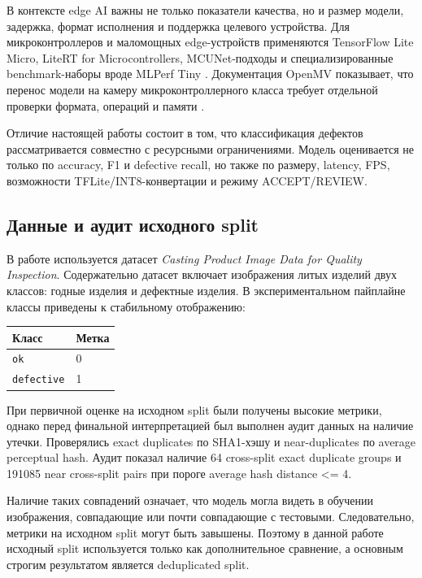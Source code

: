 \documentclass[12pt,a4paper]{article}
\begin{document}
В контексте edge AI важны не только показатели качества, но и размер модели, задержка, формат исполнения и поддержка целевого устройства. Для микроконтроллеров и маломощных edge-устройств применяются TensorFlow Lite Micro, LiteRT for Microcontrollers, MCUNet-подходы и специализированные benchmark-наборы вроде MLPerf Tiny \cite{tensorflow_lite_micro,litert_micro,lin2020mcunet,banbury2021mlperf_tiny}. Документация OpenMV показывает, что перенос модели на камеру микроконтроллерного класса требует отдельной проверки формата, операций и памяти \cite{openmv_docs,openmv_h7plus}.

Отличие настоящей работы состоит в том, что классификация дефектов рассматривается совместно с ресурсными ограничениями. Модель оценивается не только по accuracy, F1 и defective recall, но также по размеру, latency, FPS, возможности TFLite/INT8-конвертации и режиму ACCEPT/REVIEW.

\subsection{Данные и аудит исходного split}

В работе используется датасет \textit{Casting Product Image Data for Quality Inspection}. Содержательно датасет включает изображения литых изделий двух классов: годные изделия и дефектные изделия. В экспериментальном пайплайне классы приведены к стабильному отображению:

\begin{center}
\begin{tabular}{ll}
\toprule
Класс & Метка \\
\midrule
\texttt{ok} & 0 \\
\texttt{defective} & 1 \\
\bottomrule
\end{tabular}
\end{center}

При первичной оценке на исходном split были получены высокие метрики, однако перед финальной интерпретацией был выполнен аудит данных на наличие утечки. Проверялись exact duplicates по SHA1-хэшу и near-duplicates по average perceptual hash. Аудит показал наличие 64 cross-split exact duplicate groups и 191085 near cross-split pairs при пороге average hash distance <= 4.

Наличие таких совпадений означает, что модель могла видеть в обучении изображения, совпадающие или почти совпадающие с тестовыми. Следовательно, метрики на исходном split могут быть завышены. Поэтому в данной работе исходный split используется только как дополнительное сравнение, а основным строгим результатом является deduplicated split.
\end{document}
